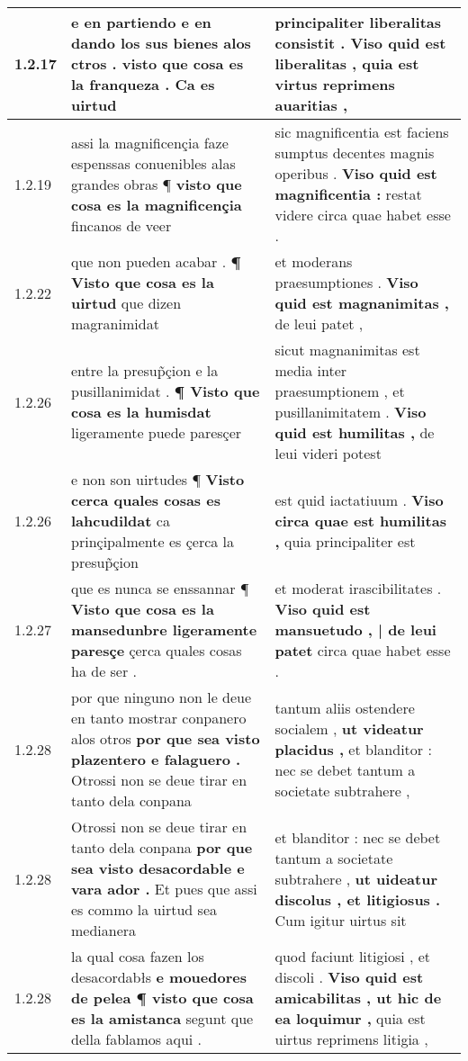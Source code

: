 \begin{tabular}{|p{1cm}|p{6.5cm}|p{6.5cm}|}

\hline
1.2.17 & e en partiendo e en dando los sus bienes alos ctros . \textbf{ visto que cosa es la franqueza . } Ca es uirtud & principaliter liberalitas consistit . \textbf{ Viso quid est liberalitas , } quia est virtus reprimens auaritias , \\\hline
1.2.19 & assi la magnificençia faze espenssas conuenibles alas grandes obras ¶ \textbf{ visto que cosa es la magnificençia } fincanos de veer & sic magnificentia est faciens sumptus decentes magnis operibus . \textbf{ Viso quid est magnificentia : } restat videre circa quae habet esse . \\\hline
1.2.22 & que non pueden acabar . \textbf{ ¶ Visto que cosa es la uirtud } que dizen magranimidat & et moderans praesumptiones . \textbf{ Viso quid est magnanimitas , } de leui patet , \\\hline
1.2.26 & entre la presup̃çion e la pusillanimidat . \textbf{ ¶ Visto que cosa es la humisdat } ligeramente puede paresçer & sicut magnanimitas est media inter praesumptionem , et pusillanimitatem . \textbf{ Viso quid est humilitas , } de leui videri potest \\\hline
1.2.26 & e non son uirtudes ¶ \textbf{ Visto cerca quales cosas es lahcudildat } ca prinçipalmente es çerca la presup̃çion & est quid iactatiuum . \textbf{ Viso circa quae est humilitas , } quia principaliter est \\\hline
1.2.27 & que es nunca se enssannar ¶ \textbf{ Visto que cosa es la mansedunbre ligeramente paresçe } çerca quales cosas ha de ser . & et moderat irascibilitates . \textbf{ Viso quid est mansuetudo , | de leui patet } circa quae habet esse . \\\hline
1.2.28 & por que ninguno non le deue en tanto mostrar conpanero alos otros \textbf{ por que sea visto plazentero e falaguero . } Otrossi non se deue tirar en tanto dela conpana & tantum aliis ostendere socialem , \textbf{ ut videatur placidus , } et blanditor : nec se debet tantum a societate subtrahere , \\\hline
1.2.28 & Otrossi non se deue tirar en tanto dela conpana \textbf{ por que sea visto desacordable e vara ador . } Et pues que assi es commo la uirtud sea medianera & et blanditor : nec se debet tantum a societate subtrahere , \textbf{ ut uideatur discolus , et litigiosus . } Cum igitur uirtus sit \\\hline
1.2.28 & la qual cosa fazen los desacordabłs \textbf{ e mouedores de pelea ¶ visto que cosa es la amistanca } segunt que della fablamos aqui . & quod faciunt litigiosi , et discoli . \textbf{ Viso quid est amicabilitas , ut hic de ea loquimur , } quia est uirtus reprimens litigia , \\\hline

\end{tabular}
